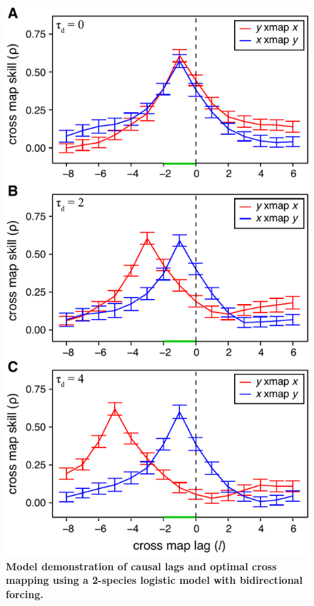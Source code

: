 \begin{figure}[!ht]
\begin{center}\includegraphics[scale = 0.7]{fig_lag_2sp_delay.pdf}\end{center}
\caption[Model demonstration of causal lags and optimal cross mapping using a 2-species logistic model with bidirectional forcing.]{\textbf{Model demonstration of causal lags and optimal cross mapping using a 2-species logistic model with bidirectional forcing.}\newline
}
\end{figure}
